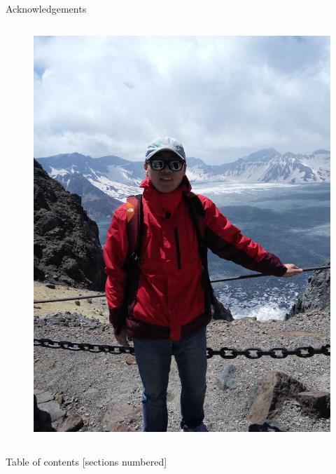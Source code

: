 \documentclass[10pt]{beamer}
\begin{document}
\begin{frame}{Acknowledgements}
\begin{columns}[T,onlytextwidth]
	\begin{figure}
		\centering
		\includegraphics[width=\textwidth]{yushuaionchangbaishan.jpg}
	\end{figure}
	
\end{columns}

\end{frame}

\begin{frame}{Table of contents}
  [sections numbered]
  \tableofcontents[hideallsubsections]
\end{frame}







\end{document}
